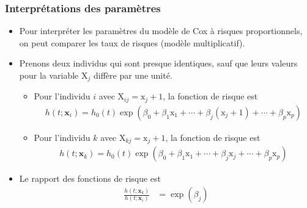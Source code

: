 \documentclass{beamer}
\begin{document}
\begin{frame}
\frametitle{Interprétations des paramètres}
\begin{itemize}
\item Pour interpréter les paramètres du modèle de Cox à risques proportionnels, on peut comparer les taux de risques (modèle multiplicatif). 
\item Prenons deux individus qui sont presque identiques, sauf que leurs valeurs pour la variable $\mathrm{X}_j$ diffère par une unité. 
\begin{itemize}
\vp \vp
\item Pour l'individu $i$ avec $\mathrm{X}_{ij}=\mathrm{x}_j+1$, la fonction de risque est
\begin{align*}
h(t; \mathbf{x}_i) = h_0(t) \exp(\beta_0 + \beta_1 \mathrm{x}_1 + \cdots + \beta_j (\mathrm{x}_j+1)+\cdots + \beta_p \mathrm{x}_p)
\end{align*}
\item Pour l'individu $k$ avec $\mathrm{X}_{kj}=\mathrm{x}_j+1$, la fonction de risque est
\begin{align*}
h(t; \mathbf{x}_k) = h_0(t) \exp(\beta_0 + \beta_1 \mathrm{x}_1 + \cdots + \beta_j \mathrm{x}_j+\cdots + \beta_p \mathrm{x}_p)
\end{align*}
\end{itemize}
\item Le \alert{rapport} des fonctions de risque  est
\begin{align*}
\frac{h(t; \mathbf{x}_k)}{h(t; \mathbf{x}_i)} &= 
 \exp(\beta_j)
\end{align*}
\end{itemize}
\end{frame}
\end{document}
